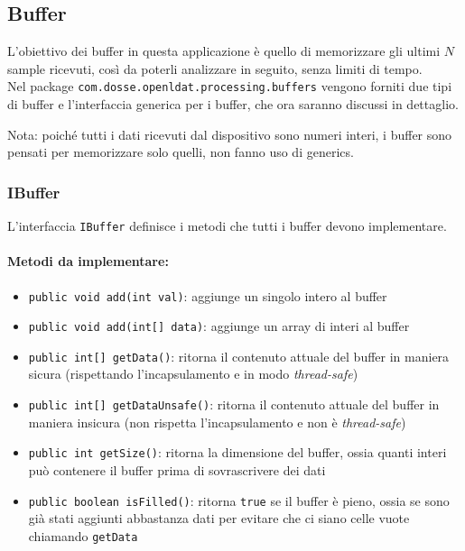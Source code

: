 \subsection{Buffer}
L'obiettivo dei buffer in questa applicazione è quello di memorizzare gli ultimi $N$ sample ricevuti, così da poterli analizzare in seguito, senza limiti di tempo.\\
Nel package \texttt{com.dosse.openldat.processing.buffers} vengono forniti due tipi di buffer e l'interfaccia generica per i buffer, che ora saranno discussi in dettaglio.

Nota: poiché tutti i dati ricevuti dal dispositivo sono numeri interi, i buffer sono pensati per memorizzare solo quelli, non fanno uso di generics.

\subsubsection{IBuffer}
L'interfaccia \texttt{IBuffer} definisce i metodi che tutti i buffer devono implementare.

\paragraph{Metodi da implementare:}\begin{itemize}
	\item \texttt{public void add(int val)}: aggiunge un singolo intero al buffer
	\item \texttt{public void add(int[] data)}: aggiunge un array di interi al buffer
	\item \texttt{public int[] getData()}: ritorna il contenuto attuale del buffer in maniera sicura (rispettando l'incapsulamento e in modo \textit{thread-safe})
	\item \texttt{public int[] getDataUnsafe()}: ritorna il contenuto attuale del buffer in maniera insicura (non rispetta l'incapsulamento e non è \textit{thread-safe})
	\item \texttt{public int getSize()}: ritorna la dimensione del buffer, ossia quanti interi può contenere il buffer prima di sovrascrivere dei dati
	\item \texttt{public boolean isFilled()}: ritorna \texttt{true} se il buffer è pieno, ossia se sono già stati aggiunti abbastanza dati per evitare che ci siano celle vuote chiamando \texttt{getData}
\end{itemize}

